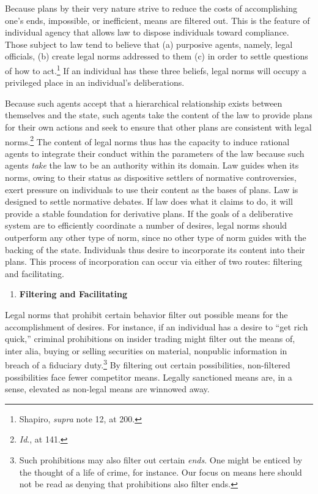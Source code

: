 Because plans by their very nature strive to reduce the costs of
accomplishing one's ends, impossible, or inefficient, means are filtered
out. This is the feature of individual agency that allows law to dispose
individuals toward compliance. Those subject to law tend to believe that
(a) purposive agents, namely, legal officials, (b) create legal norms
addressed to them (c) in order to settle questions of how to
act.\footnote{Shapiro, \emph{supra} note 12, at 200.} If an individual
has these three beliefs, legal norms will occupy a privileged place in
an individual's deliberations.

Because such agents accept that a hierarchical relationship exists
between themselves and the state, such agents take the content of the
law to provide plans for their own actions and seek to ensure that other
plans are consistent with legal norms.\footnote{\emph{Id}., at 141.} The
content of legal norms thus has the capacity to induce rational agents
to integrate their conduct within the parameters of the law because such
agents \emph{take} the law to be an authority within its domain. Law
guides when its norms, owing to their status as dispositive settlers of
normative controversies, exert pressure on individuals to use their
content as the bases of plans. Law is designed to settle normative
debates. If law does what it claims to do, it will provide a stable
foundation for derivative plans. If the goals of a deliberative system
are to efficiently coordinate a number of desires, legal norms should
outperform any other type of norm, since no other type of norm guides
with the backing of the state. Individuals thus desire to incorporate
its content into their plans. This process of incorporation can occur
via either of two routes: filtering and facilitating.

\begin{enumerate}
\def\labelenumi{\arabic{enumi}.}
\item
  \textbf{Filtering and Facilitating}
\end{enumerate}

Legal norms that prohibit certain behavior filter out possible means for
the accomplishment of desires. For instance, if an individual has a
desire to ``get rich quick,'' criminal prohibitions on insider trading
might filter out the means of, inter alia, buying or selling securities
on material, nonpublic information in breach of a fiduciary
duty.\footnote{Such prohibitions may also filter out certain
  \emph{ends}. One might be enticed by the thought of a life of crime,
  for instance. Our focus on means here should not be read as denying
  that prohibitions also filter ends.} By filtering out certain
possibilities, non-filtered possibilities face fewer competitor means.
Legally sanctioned means are, in a sense, elevated as non-legal means
are winnowed away.

